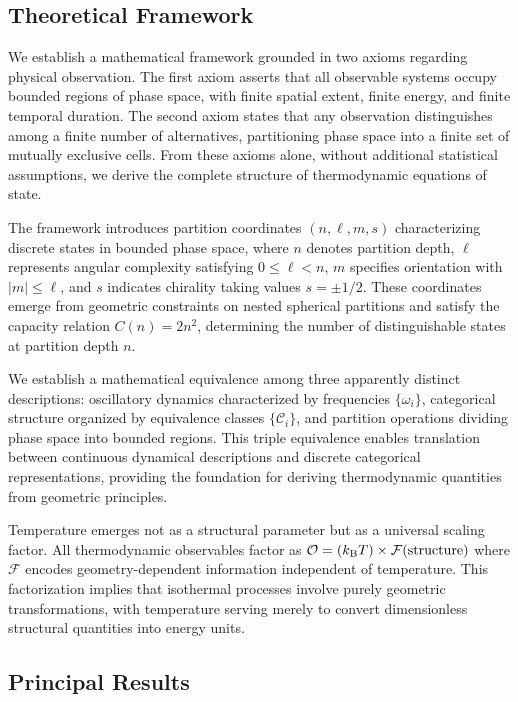 \subsection{Theoretical Framework}

We establish a mathematical framework grounded in two axioms regarding physical observation. The first axiom asserts that all observable systems occupy bounded regions of phase space, with finite spatial extent, finite energy, and finite temporal duration. The second axiom states that any observation distinguishes among a finite number of alternatives, partitioning phase space into a finite set of mutually exclusive cells. From these axioms alone, without additional statistical assumptions, we derive the complete structure of thermodynamic equations of state.

The framework introduces partition coordinates $(n,\ell,m,s)$ characterizing discrete states in bounded phase space, where $n$ denotes partition depth, $\ell$ represents angular complexity satisfying $0 \leq \ell < n$, $m$ specifies orientation with $|m| \leq \ell$, and $s$ indicates chirality taking values $s = \pm 1/2$. These coordinates emerge from geometric constraints on nested spherical partitions and satisfy the capacity relation $C(n) = 2n^2$, determining the number of distinguishable states at partition depth $n$.

We establish a mathematical equivalence among three apparently distinct descriptions: oscillatory dynamics characterized by frequencies $\{\omega_i\}$, categorical structure organized by equivalence classes $\{\mathcal{C}_i\}$, and partition operations dividing phase space into bounded regions. This triple equivalence enables translation between continuous dynamical descriptions and discrete categorical representations, providing the foundation for deriving thermodynamic quantities from geometric principles.

Temperature emerges not as a structural parameter but as a universal scaling factor. All thermodynamic observables factor as $\mathcal{O} = (k_{\mathrm{B}} T) \times \mathcal{F}(\text{structure})$ where $\mathcal{F}$ encodes geometry-dependent information independent of temperature. This factorization implies that isothermal processes involve purely geometric transformations, with temperature serving merely to convert dimensionless structural quantities into energy units.

\subsection{Principal Results}

